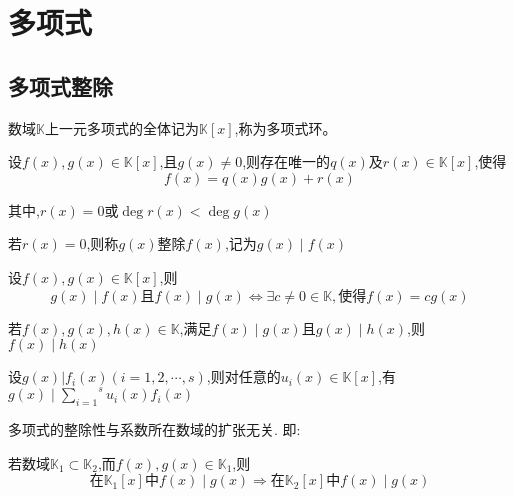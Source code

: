 \chapter{多项式}
\section{多项式整除}

\begin{knowledge}[多项式环]
    数域$\mathbb{K}$上一元多项式的全体记为$\mathbb{K}[x]$,称为多项式环。
\end{knowledge}

\begin{knowledge}[带余除法]
    设$f(x),g(x)\in \mathbb{K}[x]$,且$g(x)\ne 0$,则存在唯一的$q(x)$及$r(x)\in \mathbb{K}[x]$,使得
    \begin{equation}
        f(x)=q(x)g(x)+r(x)
    \end{equation}

    其中,$r(x)=0$或$\deg r(x)<\deg g(x)$

    若$r(x)=0$,则称$g(x)$整除$f(x)$,记为$g(x)\mid f(x)$
\end{knowledge}

\begin{knowledge}[多项式等价]
    设$f(x),g(x)\in \mathbb{K}[x]$,则
    \begin{equation}
        g(x)\mid f(x)\mbox{且}f(x)\mid g(x) \Longleftrightarrow \exists c\ne 0\in \mathbb{K},\mbox{使得}f(x)=cg(x)
    \end{equation}
\end{knowledge}

\begin{knowledge}[整除的传递性] \label{整除的传递性}
    若$f(x),g(x),h(x)\in \mathbb{K}$,满足$f(x)\mid g(x)$且$g(x)\mid h(x)$,则$f(x)\mid h(x)$
\end{knowledge}

\begin{knowledge}[整除线性组合]
    \label{整除线性组合}
    设$g(x)|f_{i}(x)(i=1,2,\cdots,s)$,则对任意的$u_i(x)\in \mathbb{K}[x]$,有$g(x)\mid \overset{s}{\underset{i=1}{\sum}}u_i(x)f_i(x)$
\end{knowledge}

\begin{knowledge}[数域扩张不影响整除性]
    多项式的整除性与系数所在数域的扩张无关. 即:

    若数域$\mathbb{K}_1\subset \mathbb{K}_2$,而$f(x),g(x)\in \mathbb{K}_1$,则
    \begin{equation}
        \mbox{在$\mathbb{K}_1[x]$中}f(x)\mid g(x)\Longrightarrow \mbox{在$\mathbb{K}_2[x]$中}f(x)\mid g(x)
    \end{equation}
\end{knowledge}


